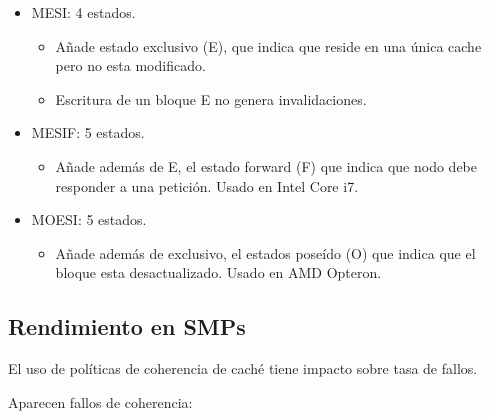 \documentclass[12pt, twoside, openright]{report} %
\begin{document}
    \begin{itemize}
    
    \item
      MESI: 4 estados.

      \begin{itemize}
      
      \item
        Añade estado exclusivo (E), que indica que reside en una única
        cache pero no esta modificado.
      \item
        Escritura de un bloque E no genera invalidaciones.
      \end{itemize}
    \item
      MESIF: 5 estados.

      \begin{itemize}
      
      \item
        Añade además de E, el estado forward (F) que indica que nodo
        debe responder a una petición. Usado en Intel Core i7.
      \end{itemize}
    \item
      MOESI: 5 estados.

      \begin{itemize}
      
      \item
        Añade además de exclusivo, el estados poseído (O) que indica
        que el bloque esta desactualizado. Usado en AMD Opteron.
      \end{itemize}
    \end{itemize}

\subsection{Rendimiento en SMPs}


    El uso de políticas de coherencia de caché tiene impacto sobre
    tasa de fallos.

    Aparecen fallos de coherencia:
\end{document}
